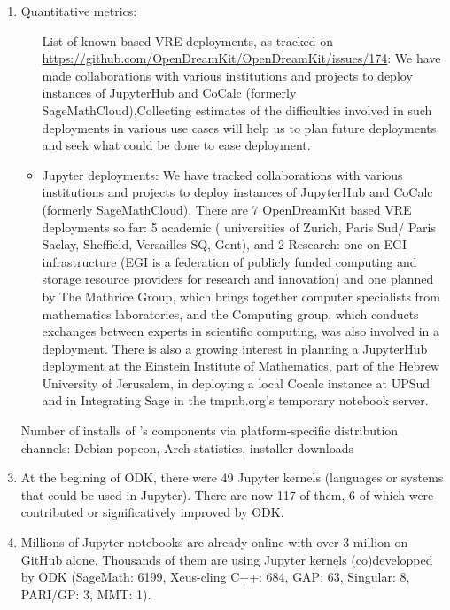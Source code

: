 \begin{enumerate}
\item Quantitative metrics:
\begin{itemize}
\item[List of known \ODK based VRE deployments, as tracked on \url{https://github.com/OpenDreamKit/OpenDreamKit/issues/174}:] We have made 
collaborations with various institutions and projects to deploy instances of JupyterHub and CoCalc (formerly SageMathCloud),Collecting 
estimates of the difficulties involved in such deployments in various use cases will help us to plan future 
deployments and seek what could be done to ease deployment.

\item Jupyter deployments:%
We have tracked collaborations with various institutions and projects to deploy instances of JupyterHub and CoCalc (formerly SageMathCloud). There are 7 OpenDreamKit based VRE deployments so far: 5 academic (  universities of Zurich, Paris Sud/ Paris Saclay, Sheffield, Versailles SQ, Gent), and 2 Research: one on EGI infrastructure (EGI is a federation of publicly funded computing and storage resource providers for research and innovation) and one planned by The Mathrice Group, which brings together computer specialists from mathematics laboratories, and the Computing group, which conducts exchanges between experts in scientific computing, was also involved in a deployment. 
There is also a growing interest in planning a JupyterHub deployment at the Einstein Institute of Mathematics, part of the Hebrew University of Jerusalem, in deploying a local Cocalc instance at UPSud and in Integrating Sage in the tmpnb.org's temporary notebook server.
\end{itemize}

\item [Number of installs of \ODK's components via platform-specific distribution channels: Debian popcon, Arch statistics, installer
  downloads]


\item At the begining of ODK, there were 49 Jupyter kernels (languages or systems that could be used in Jupyter). There are now 117 of them, 6 of which were contributed or significatively improved by ODK.
\item Millions of Jupyter notebooks are already online with over 3 million on GitHub alone. Thousands of them are using Jupyter kernels (co)developped by ODK (SageMath: 6199, Xeus-cling C++: 684, GAP: 63, Singular: 8, PARI/GP: 3, MMT: 1).


\end{enumerate}
